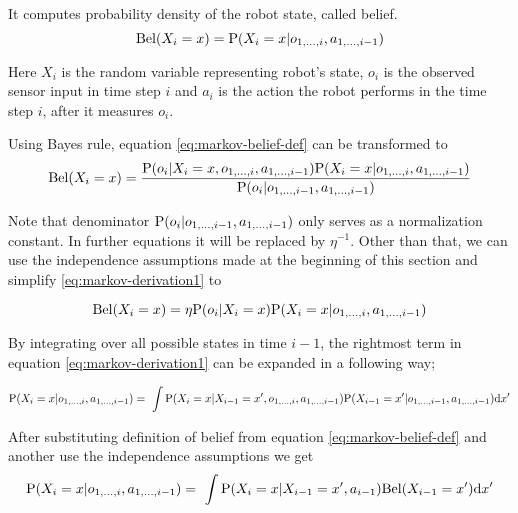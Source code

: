 It computes probability density of the robot state, called belief.
\begin{equation}
	\label{eq:markov-belief-def}
	\Bel(X_i = x) = \P(X_i = x | o_{1, \dotsc, i}, a_{1,\dotsc,i - 1})
\end{equation}

Here \(X_i\) is the random variable representing robot's state,
\(o_i\) is the observed sensor input in time step \(i\) and \(a_i\)
is the action the robot performs in the time step \(i\), after it
measures \(o_i\).

Using Bayes rule, equation \eqref{eq:markov-belief-def} can be transformed to
\begin{equation}
	\label{eq:markov-derivation1}
	\Bel(X_i = x) =
	\frac{
		\P(o_i | X_i = x, o_{1, \dotsc, i}, a_{1,\dotsc,i - 1})
		\P(X_i = x | o_{1, \dotsc, i}, a_{1, \dotsc, i - 1})
	}{
		\P(o_i | o_{1, \dotsc, i-1}, a_{1, \dotsc, i-1})
	}
\end{equation}

Note that denominator \(\P(o_i | o_{1, \dotsc, i-1}, a_{1, \dotsc, i-1})\) only
serves as a normalization constant.
In further equations it will be replaced by \(\eta^{-1}\).
Other than that, we can use the independence assumptions made at the beginning
of this section and simplify \eqref{eq:markov-derivation1} to

\begin{equation}
	\label{eq:markov-derivation2}
	\Bel(X_i = x) =
		\eta \P(o_i | X_i = x)
		\P(X_i = x | o_{1, \dotsc, i}, a_{1, \dotsc, i - 1})
\end{equation}


By integrating over all possible states in time \(i - 1\), the rightmost term in
equation \eqref{eq:markov-derivation1} can be expanded in a following way;

\begin{equation}
	\label{eq:markov-derivation3}
	\P(X_i = x | o_{1, \dotsc, i}, a_{1, \dotsc, i - 1}) = \
	\int
	\P(X_i = x | X_{i - 1}=x', o_{1, \dotsc, i}, a_{1, \dotsc, i - 1})
	\P(X_{i-1} = x' | o_{1, \dotsc, i-1}, a_{1, \dotsc, i-1})
	\mathrm{d}x'
\end{equation}

After substituting definition of belief from equation \eqref{eq:markov-belief-def}
and another use the independence assumptions we get
\begin{equation}
	\label{eq:markov-derivation4}
	\P(X_i = x | o_{1, \dotsc, i}, a_{1, \dotsc, i - 1}) = \
	\int
	\P(X_i = x | X_{i - 1}=x', a_{i - 1})
	\Bel(X_{i-1} = x')
	\mathrm{d}x'
\end{equation}

